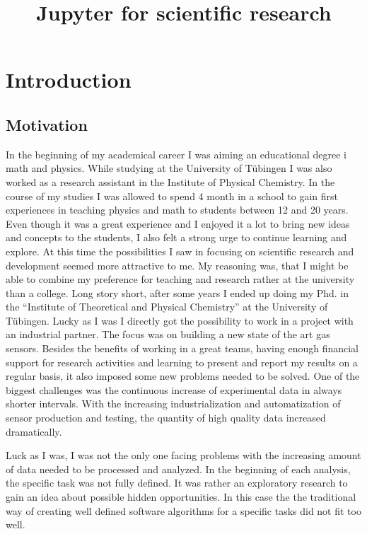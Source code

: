\documentclass[11pt]{article}
\title{Jupyter for scientific research}
\begin{document}
    
    \maketitle
    
    

    
    \tableofcontents 
\setcounter{section}{0}
\setcounter{page}{1}

    \hypertarget{introduction}{%
\section{Introduction}\label{introduction}}

\hypertarget{motivation}{%
\subsection{Motivation}\label{motivation}}

In the beginning of my academical career I was aiming an educational
degree i math and physics. While studying at the University of Tübingen
I was also worked as a research assistant in the Institute of Physical
Chemistry. In the course of my studies I was allowed to spend 4 month in
a school to gain first experiences in teaching physics and math to
students between 12 and 20 years. Even though it was a great experience
and I enjoyed it a lot to bring new ideas and concepts to the students,
I also felt a strong urge to continue learning and explore. At this time
the possibilities I saw in focusing on scientific research and
development seemed more attractive to me. My reasoning was, that I might
be able to combine my preference for teaching and research rather at the
university than a college. Long story short, after some years I ended up
doing my Phd. in the ``Institute of Theoretical and Physical Chemistry''
at the University of Tübingen. Lucky as I was I directly got the
possibility to work in a project with an industrial partner. The focus
was on building a new state of the art gas sensors. Besides the benefits
of working in a great teams, having enough financial support for
research activities and learning to present and report my results on a
regular basis, it also imposed some new problems needed to be solved.
One of the biggest challenges was the continuous increase of
experimental data in always shorter intervals. With the increasing
industrialization and automatization of sensor production and testing,
the quantity of high quality data increased dramatically.

Luck as I was, I was not the only one facing problems with the
increasing amount of data needed to be processed and analyzed. In the
beginning of each analysis, the specific task was not fully defined. It
was rather an exploratory research to gain an idea about possible hidden
opportunities. In this case the the traditional way of creating well
defined software algorithms for a specific tasks did not fit too well.
\end{document}
